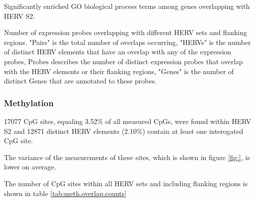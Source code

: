 \documentclass[a4paper,12pt]{article}
\begin{document}
\begin{table}[h!]
  \begin{center}
  \end{center}        
	\caption{Significantly enriched GO biological process terms among genes overlapping with HERV S2.}
	\label{tab:expr.overlap.counts}
\end{table}



\begin{table}[h!]
  \begin{center}
  \end{center}        
	\caption{Number of expression probes overlapping with different HERV sets and flanking regions. "Pairs" is the total number of overlaps occurring, "HERVs" is the number of distinct HERV elements that have an overlap with any of the expression probes, Probes describes the number of distinct expression probes that overlap with the HERV elements or their flanking regions, "Genes" is the number of distinct Genes that are annotated to these probes.}
	\label{tab:expr.overlap.counts}
\end{table}

\subsubsection{Methylation}
17077 CpG sites, equaling 3.52\% of all measured CpGs, were found within HERV S2 and 12871 distinct HERV elements (2.10\%) contain at least one interogated CpG site.


The variance of the measurements of these sites, which is shown in figure \ref{fig:}, is lower on average.

The number of CpG sites within all HERV sets and including flanking regions is shown in table \ref{tab:meth.overlap.counts}
\end{document}
